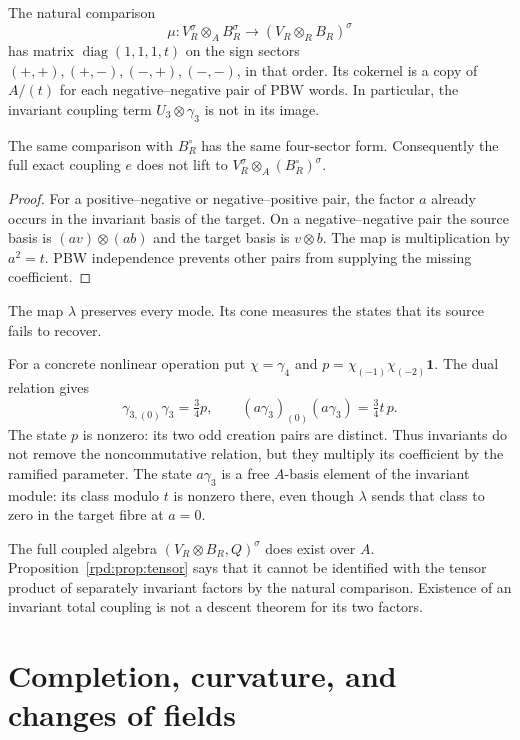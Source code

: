 \begin{proposition}\label{rpd:prop:tensor}

The natural comparison
\[
 \mu:V_R^\sigma\otimes_A B_R^\sigma
       \longrightarrow (V_R\otimes_R B_R)^\sigma
\]
has matrix $\operatorname{diag}(1,1,1,t)$ on the sign sectors
$(+,+),(+,-),(-,+),(-,-)$, in that order.
Its cokernel is a copy of $A/(t)$ for each negative--negative pair of
PBW words. In particular, the invariant coupling term
$U_3\otimes\gamma_3$ is not in its image.

The same comparison with $B_R^\circ$ has the same four-sector form.
Consequently the full exact coupling $e$ does not lift to
$V_R^\sigma\otimes_A(B_R^\circ)^\sigma$.
\end{proposition}
\begin{proof}

For a positive--negative or negative--positive pair, the factor $a$
already occurs in the invariant basis of the target. On a
negative--negative pair the source basis is $(av)\otimes(ab)$ and
the target basis is $v\otimes b$. The map is multiplication by
$a^2=t$. PBW independence prevents other pairs from supplying the
missing coefficient.\qedhere
\end{proof}

The map $\lambda$ preserves every mode. Its cone measures the states
that its source fails to recover.

\begin{example}\label{rpd:ex:collision}
For a concrete nonlinear operation put $\chi=\gamma_4$ and
$p=\chi_{(-1)}\chi_{(-2)}\mathbf1$. The dual relation gives
\[
 \gamma_{3,(0)}\gamma_3=\tfrac34p,\qquad
 (a\gamma_3)_{(0)}(a\gamma_3)=\tfrac34t\,p.
\]
The state $p$ is nonzero: its two odd creation pairs are distinct.
Thus invariants do not remove the noncommutative relation, but they
multiply its coefficient by the ramified parameter. The state $a\gamma_3$
is a free $A$-basis element of the invariant module: its class modulo
$t$ is nonzero there, even though $\lambda$ sends that class to zero
in the target fibre at $a=0$.
\end{example}

The full coupled algebra $(V_R\otimes B_R,Q)^\sigma$ does exist over
$A$. Proposition~\ref{rpd:prop:tensor} says that it cannot be
identified with the tensor product of separately invariant factors
by the natural comparison. Existence of an invariant total coupling
is not a descent theorem for its two factors.

\section{Completion, curvature, and changes of fields}


